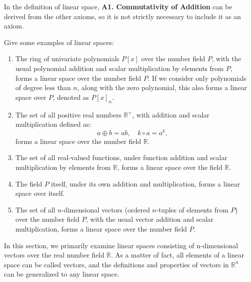 \documentclass[11pt]{../../TexTemplate/elegantbook} %
\begin{document}
\begin{remark}
    In the definition of linear space, \textbf{A1. Commutativity of Addition} can be derived from the other axioms,
    so it is not strictly necessary to include it as an axiom.
\end{remark}

\vspace{0.7cm}
Give some examples of linear spaces:
\begin{enumerate}
    \item The ring of univariate polynomials \( P[x] \) over the number field \( P \), 
        with the usual polynomial addition and scalar multiplication by elements from \( P \), 
        forms a linear space over the number field \( P \). 
        If we consider only polynomials of degree less than \( n \), along with the zero polynomial, 
        this also forms a linear space over \( P \), denoted as \( P[x]_n \).
        
    \item The set of all positive real numbers \( \mathbb{R}^+ \), with addition and scalar multiplication defined as:
        \[
        a \oplus b = ab, \quad k \circ a = a^k,
        \]
        forms a linear space over the number field \( \mathbb{R} \).
    
    \item The set of all real-valued functions, 
        under function addition and scalar multiplication by elements from \( \mathbb{R} \), 
        forms a linear space over the field \( \mathbb{R} \).
    
    \item The field \( P \) itself, under its own addition and multiplication, forms a linear space over itself.
    
    \item The set of all \(n\)-dimensional vectors (ordered \( n \)-tuples of elements from \( P \))
        over the number field \( P \),
        with the usual vector addition and scalar multiplication, 
        forms a linear space over the number field \( P \).
\end{enumerate}

\vspace{0.7cm}
In this section, we primarily examine linear spaces consisting of n-dimensional vectors over the real number field \( \mathbb{R} \).
As a matter of fact, all elements of a linear space can be called vectors,
and the definitions and properties of vectors in \( \mathbb{R}^n \) can be generalized to any linear space.
\end{document}
